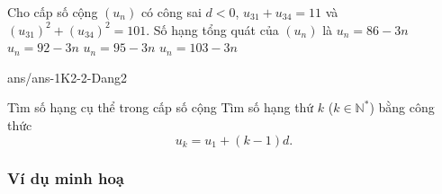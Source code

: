 \begin{ex}%
	Cho cấp số cộng $(u_n)$ có công sai $d<0$, $u_{31}+u_{34}=11$ và $(u_{31})^2 + (u_{34})^2=101$. Số hạng tổng quát của $(u_n)$ là
	\choice
	{$u_{n}=86-3n$}
	{$u_{n}=92-3n$}
	{$u_{n}=95-3n$}
	{\True $u_{n}=103-3n$}
\end{ex}
\begin{indapan}{10}
	{ans/ans-1K2-2-Dang2}
\end{indapan}
\begin{dang}
	{Tìm số hạng cụ thể trong cấp số cộng}
	Tìm số hạng thứ $k$ ($k\in \mathbb{N}^*$) bằng công thức
	\[
	u_k= u_1+ (k-1)d.
	\]
\end{dang}

\subsubsection{Ví dụ minh hoạ}

